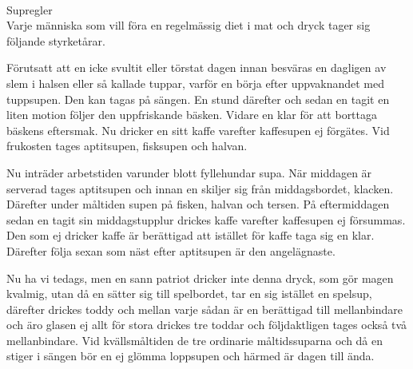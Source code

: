 \documentclass[a6paper,10pt]{article}
\begin{document}
\noindent
{}
\vspace{10pt} \\
\Large Supregler\\
\small 
Varje människa som vill föra en regelmässig diet i mat och dryck tager sig följande styrketårar.

Förutsatt att en icke svultit eller törstat dagen innan besväras en dagligen av slem i halsen eller så kallade tuppar, varför en börja efter uppvaknandet med tuppsupen. Den kan tagas på sängen. En stund därefter och sedan en tagit en liten motion följer den uppfriskande bäsken. Vidare en klar för att borttaga bäskens eftersmak. Nu dricker en sitt kaffe varefter kaffesupen ej förgätes. Vid frukosten tages aptitsupen, fisksupen och halvan.

Nu inträder arbetstiden varunder blott fyllehundar supa. När middagen är serverad tages aptitsupen och innan en skiljer sig från middagsbordet, klacken. Därefter under måltiden supen på fisken, halvan och tersen. På eftermiddagen sedan en tagit sin middagstupplur drickes kaffe varefter kaffesupen ej försummas. Den som ej dricker kaffe är berättigad att istället för kaffe taga sig en klar. Därefter följa sexan som näst efter aptitsupen är den angelägnaste.

Nu ha vi tedags, men en sann patriot dricker inte denna dryck, som gör magen kvalmig, utan då en sätter sig till spelbordet, tar en sig istället en spelsup, därefter drickes toddy och mellan varje sådan är en berättigad till mellanbindare och äro glasen ej allt för stora drickes tre toddar och följdaktligen tages också två mellanbindare. Vid kvällsmåltiden de tre ordinarie måltidssuparna och då en stiger i sängen bör en ej glömma loppsupen och härmed är dagen till ända. 
\end{document}
